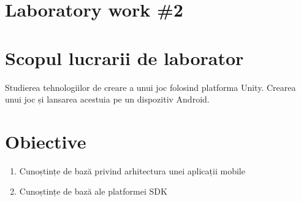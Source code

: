 \section*{Laboratory work \#2}

\section{Scopul lucrarii de laborator}
Studierea tehnologiilor de creare a unui joc folosind platforma Unity. Crearea unui joc și lansarea acestuia pe un dispozitiv Android.
\section{Obiective}

\begin{enumerate}
\item Cunoștințe de bază privind arhitectura unei aplicații mobile
\item Cunoștințe de bază ale platformei SDK
\end{enumerate}

\clearpage
